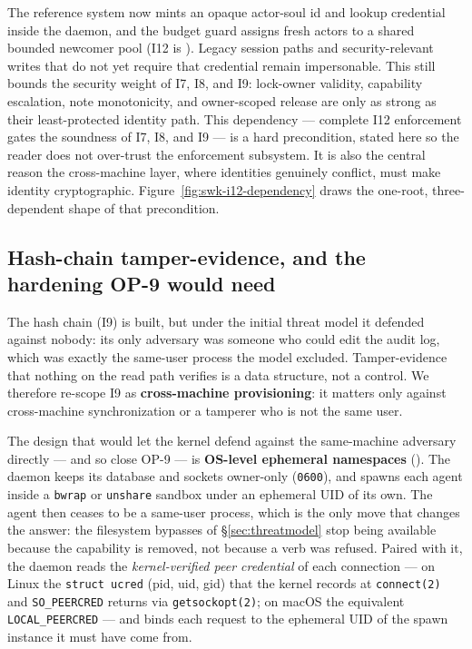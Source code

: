 \documentclass[11pt,a4paper]{article}
\theoremstyle{definition}
\theoremstyle{remark}
\begin{document}
The reference system now mints an opaque actor-soul id and lookup credential inside
the daemon, and the budget guard assigns fresh actors to a shared bounded newcomer
pool (I12 is \BuiltWeak). Legacy session paths and security-relevant writes that do
not yet require that credential remain impersonable. This still bounds the security
weight of I7, I8, and I9: lock-owner validity, capability escalation, note
monotonicity, and owner-scoped release are only as strong as their least-protected
identity path. This dependency --- complete I12 enforcement gates the soundness of
I7, I8, and I9 --- is a hard precondition, stated here so the reader does not
over-trust the enforcement subsystem. It is also the central reason the cross-machine
layer, where identities genuinely conflict, must make identity cryptographic.
Figure~\ref{fig:swk-i12-dependency} draws the one-root, three-dependent shape of
that precondition.



\subsection{Hash-chain tamper-evidence, and the hardening OP-9 would need}
\label{sec:merkle}

The hash chain (I9) is built, but under the initial threat model it defended
against nobody: its only adversary was someone who could edit the audit log, which was
exactly the same-user process the model excluded. Tamper-evidence that
nothing on the read path verifies is a data structure, not a control. We therefore
re-scope I9 as \textbf{cross-machine provisioning}: it matters only against
cross-machine synchronization or a tamperer who is not the same user.

The design that would let the kernel defend against the same-machine adversary
directly --- and so close OP-9 --- is \textbf{OS-level ephemeral namespaces}
(\Designed). The daemon keeps its database and sockets owner-only
(\texttt{0600}), and spawns each agent inside a \texttt{bwrap} or \texttt{unshare}
sandbox under an ephemeral UID of its own. The agent then ceases to be a same-user
process, which is the only move that changes the answer: the filesystem bypasses of
\S\ref{sec:threatmodel} stop being available because the capability is removed, not
because a verb was refused. Paired with it, the daemon reads the
\emph{kernel-verified peer credential} of each connection --- on Linux the
\texttt{struct ucred} (pid, uid, gid) that the kernel records at \texttt{connect(2)}
and \texttt{SO\_PEERCRED} returns via \texttt{getsockopt(2)}; on macOS the
equivalent \texttt{LOCAL\_PEERCRED} --- and binds each request to the ephemeral UID
of the spawn instance it must have come from.
\end{document}
